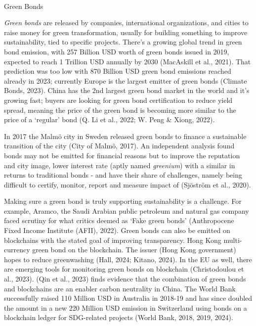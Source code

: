 \documentclass[
  letterpaper,
  DIV=11,
  numbers=noendperiod]{scrartcl}
\makeatletter
\let\oldparagraph\paragraph
\renewcommand{\paragraph}{
    \@ifstar
      \xxxParagraphStar
      \xxxParagraphNoStar
  }
\newcommand{\xxxParagraphStar}[1]{\oldparagraph*{#1}\mbox{}}
\newcommand{\xxxParagraphNoStar}[1]{\oldparagraph{#1}\mbox{}}
\makeatother
\begin{document}
\paragraph{Green Bonds}\label{green-bonds}

\emph{Green bonds} are released by companies, international
organizations, and cities to raise money for green transformation,
usually for building something to improve sustainability, tied to
specific projects. There's a growing global trend in green bond
emission, with 257 Billion USD worth of green bonds issued in 2019,
expected to reach 1 Trillion USD annually by 2030 (MacAskill et al.,
2021). That prediction was too low with 870 Billion USD green bond
emissions reached already in 2023; currently Europe is the largest
emitter of green bonds (Climate Bonds, 2023). China has the 2nd largest
green bond market in the world and it's growing fast; buyers are looking
for green bond certification to reduce yield spread, meaning the price
of the green bond is becoming more similar to the price of a `regular'
bond (Q. Li et al., 2022; W. Peng \& Xiong, 2022).

In 2017 the Malmö city in Sweden released green bonds to finance a
sustainable transition of the city (City of Malmö, 2017). An independent
analysis found bonds may not be emitted for financial reasons but to
improve the reputation and city image, lower interest rate (aptly named
\emph{greenium}) with a similar in returns to traditional bonds - and
have their share of challenges, namely being difficult to certify,
monitor, report and measure impact of (Sjöström et al., 2020).

Making sure a green bond is truly supporting sustainability is a
challenge. For example, Aramco, the Saudi Arabian public petroleum and
natural gas company faced scrutiny for what critics deemed as `Fake
green bonds' (Anthropocene Fixed Income Institute (AFII), 2022). Green
bonds can also be emitted on blockchains with the stated goal of
improving transparency. Hong Kong multi-currency green bond on the
blockchain. The issuer (Hong Kong government) hopes to reduce
greenwashing (Hall, 2024; Kitano, 2024). In the EU as well, there are
emerging tools for monitoring green bonds on blockchain (Christodoulou
et al., 2023). (Qin et al., 2023) finds evidence that the combination of
green bonds and blockchains are an enabler carbon neutrality in China.
The World Bank successfully raised 110 Million USD in Australia in
2018-19 and has since doubled the amount in a new 220 Million USD
emission in Switzerland using bonds on a blockchain ledger for
SDG-related projects (World Bank, 2018, 2019, 2024).
\end{document}
